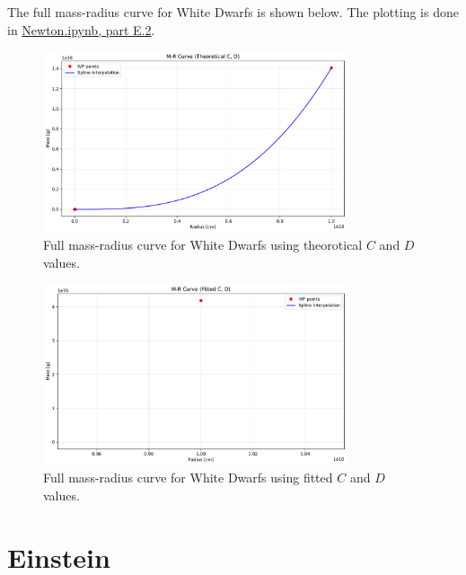 \documentclass[12pt]{article}
\begin{document}
The full mass-radius curve for White Dwarfs is shown below. The plotting is done in \href{Newton.ipynb}{Newton.ipynb, part E.2}.
\begin{figure}[H] %
    \centering
    \includegraphics[width=0.8\textwidth]{Newton_PartE2_theoretical.pdf}
    \caption{Full mass-radius curve for White Dwarfs using theorotical \(C\) and \(D\) values.}
    \label{fig:newton-parte2t}
\end{figure}

\begin{figure}[H] %
    \centering
    \includegraphics[width=0.8\textwidth]{Newton_PartE2_calculated.pdf}
    \caption{Full mass-radius curve for White Dwarfs using fitted \(C\) and \(D\) values.}
    \label{fig:newton-parte2c}
\end{figure}

\clearpage %

\section*{Einstein}
\end{document}
